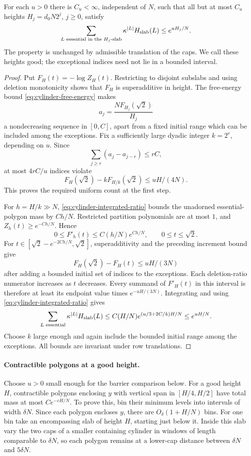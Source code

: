 \begin{auxlemma}
For each $u>0$ there is $C_u<\infty$, independent of $N$, such that all but at most $C_u$ heights $H_j=d_0N2^j$, $j\ge0$, satisfy
\begin{equation}
 \sum_{L\text{ essential in the }H_j\text{-slab}}
       \kappa^{|L|}H_{\rm slab}(L)\le e^{uH_j/N}.
 \label{eq:legacy-P-g}
\end{equation}
The property is unchanged by admissible translation of the caps. We call these heights good; the exceptional indices need not lie in a bounded interval.
\end{auxlemma}
\begin{proof}
Put $F_H(t)=-\log Z_H(t)$. Restricting to disjoint subslabs and using deletion monotonicity shows that $F_H$ is superadditive in height. The free-energy bound \eqref{eq:cylinder-free-energy} makes
\[
 a_j=\frac{N F_{H_j}(\sqrt2)}{H_j}
\]
a nondecreasing sequence in $[0,C]$, apart from a fixed initial range which can be included among the exceptions. Fix a sufficiently large dyadic integer $k=2^r$, depending on $u$. Since
\[
 \sum_{j\ge r}(a_j-a_{j-r})\le rC,
\]
at most $4rC/u$ indices violate
\[
 F_H(\sqrt2)-kF_{H/k}(\sqrt2)\le uH/(4N).
\]
This proves the required uniform count at the first step.

For $h=H/k\gg N$, \eqref{eq:cylinder-integrated-ratio} bounds the unadorned essential-polygon mass by $Ch/N$. Restricted partition polynomials are at most $1$, and $Z_h(t)\ge e^{-Ch/N}$. Hence
\[
 0\le F'_h(t)\le C(h/N)e^{Ch/N},\qquad 0\le t\le\sqrt2.
\]
For $t\in[\sqrt2-e^{-2Ch/N},\sqrt2]$, superadditivity and the preceding increment bound give
\[
 F_H(\sqrt2)-F_H(t)\le uH/(3N)
\]
after adding a bounded initial set of indices to the exceptions. Each deletion-ratio numerator increases as $t$ decreases. Every summand of $F'_H(t)$ in this interval is therefore at least its endpoint value times $e^{-uH/(3N)}$. Integrating and using \eqref{eq:cylinder-integrated-ratio} gives
\[
 \sum_{L\text{ essential}}\kappa^{|L|}H_{\rm slab}(L)
 \le C(H/N)e^{(u/3+2C/k)H/N}\le e^{uH/N}.
\]
Choose $k$ large enough and again include the bounded initial range among the exceptions. All bounds are invariant under row translations.
\end{proof}

\paragraph{Contractible polygons at a good height.}
Choose $u>0$ small enough for the barrier comparison below. For a good height $H$, contractible polygons enclosing $y$ with vertical span in $[H/4,H/2]$ have total mass at most $Ce^{-cH/N}$. To prove this, bin their minimum levels into intervals of width $\delta N$. Since each polygon encloses $y$, there are $O_\delta(1+H/N)$ bins. For one bin take an encompassing slab of height $H$, starting just below it. Inside this slab vary the two caps of a smaller containing cylinder in windows of length comparable to $\delta N$, so each polygon remains at a lower-cap distance between $\delta N$ and $5\delta N$.

